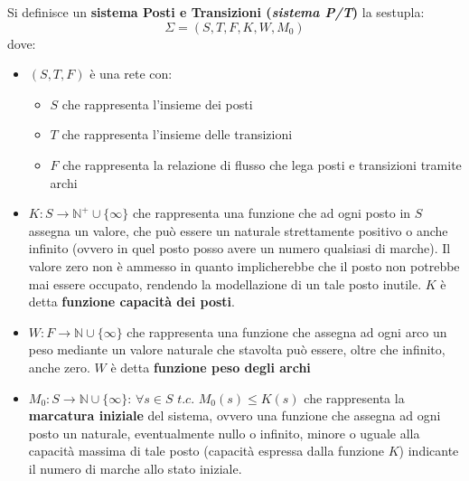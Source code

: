 \documentclass[a4paper,12pt, oneside]{book}
\begin{document}
\begin{definizione}
  Si definisce un \textbf{sistema Posti e Transizioni (\textit{sistema P/T})} la
  sestupla: 
  \[\Sigma=(S,T,F,K,W,M_0)\]
  dove:
  \begin{itemize}
    \item $(S,T,F)$ è una rete con:
    \begin{itemize}
      \item $S$ che rappresenta l'insieme dei posti
      \item $T$ che rappresenta l'insieme delle transizioni
      \item $F$ che rappresenta la relazione di flusso che lega posti e
      transizioni tramite archi
    \end{itemize}
    \item $K:S\to\mathbb{N}^{+}\cup \{\infty\}$ che rappresenta una funzione che
    ad ogni posto in $S$ assegna un valore, che può essere un naturale
    strettamente positivo o anche infinito (ovvero in quel posto posso avere un
    numero qualsiasi di marche). Il valore zero non è ammesso in quanto
    implicherebbe che il posto non potrebbe mai essere occupato, rendendo la
    modellazione di un tale posto inutile. $K$ è detta \textbf{funzione
      capacità dei posti}.
    \item $W:F\to\mathbb{N}\cup \{\infty\}$  che rappresenta una funzione che
    assegna ad ogni arco un peso mediante un valore naturale che stavolta può
    essere, oltre che infinito, anche zero. $W$ è detta \textbf{funzione peso
      degli archi}
    \item $M_0:S\to \mathbb{N}\cup\{\infty\}:\,\forall s\in
    S\,\,t.c.\,\,M_0(s)\leq K(s)$ che rappresenta la \textbf{marcatura iniziale}
    del sistema, ovvero una funzione che assegna ad ogni posto un naturale,
    eventualmente nullo o infinito, minore o uguale alla capacità massima di
    tale posto (capacità espressa dalla funzione $K$) indicante il numero di
    marche allo stato iniziale. 
  \end{itemize}
\end{definizione}
\end{document}
